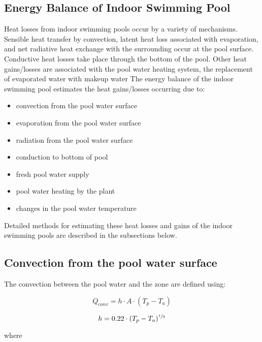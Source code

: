 \subsection{Energy Balance of Indoor Swimming Pool}\label{energy-balance-of-indoor-swimming-pool}

Heat losses from indoor swimming pools occur by a variety of mechanisms. Sensible heat transfer by convection, latent heat loss associated with evaporation, and net radiative heat exchange with the surrounding occur at the pool surface. Conductive heat losses take place through the bottom of the pool. Other heat gains/losses are associated with the pool water heating system, the replacement of evaporated water with makeup water The energy balance of the indoor swimming pool estimates the heat gains/losses occurring due to:

\begin{itemize}
\tightlist
\item
  convection from the pool water surface
\item
  evaporation from the pool water surface
\item
  radiation from the pool water surface
\item
  conduction to bottom of pool
\item
  fresh pool water supply
\item
  pool water heating by the plant
\item
  changes in the pool water temperature
\end{itemize}

Detailed methods for estimating these heat losses and gains of the indoor swimming pools are described in the subsections below.

\subsection{Convection from the pool water surface}\label{convection-from-the-pool-water-surface}

The convection between the pool water and the zone are defined using:

\begin{equation}
Q_{conv} = h \cdot A \cdot (T_p - T_a)
\end{equation}

\begin{equation}
h = 0.22 \cdot (T_p - T_a)^{\sfrac{1}{3}}
\end{equation}

where


